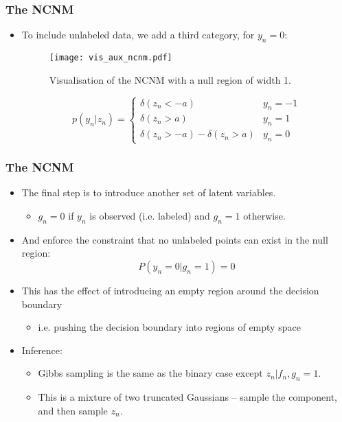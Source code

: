 \begin{frame}
	\frametitle{The \ac{NCNM}}
	\begin{itemize}
		\item To include unlabeled data, we add a third category, for $y_n=0$:
		\begin{figure}[tbh]
			\centering\texttt{[image: vis\_aux\_ncnm.pdf]}
			\centering\caption{\label{fig:vis_aux_ncnm}Visualisation of the \ac{NCNM} with a null region of width 1.}
		\end{figure}
		\[
			p(y_n|z_n) = \left\{ 
				\begin{array}{ll}
					\delta(z_n<-a) & y_n = -1\\
					\delta(z_n>a) & y_n = 1\\
					\delta(z_n>-a) - \delta(z_n>a) & y_n=0
				\end{array}
			\right.
		\]
	\end{itemize}
\end{frame}

\begin{frame}
	\frametitle{The \ac{NCNM}}
	\begin{itemize}
		\item The final step is to introduce another set of latent variables.
		\begin{itemize}
			\item $g_n=0$ if $y_n$ is observed (i.e. labeled) and $g_n=1$ otherwise.
		\end{itemize}
		\item And enforce the constraint that no unlabeled points can exist in the null region:
		\[
			P(y_n=0|g_n=1) = 0
		\]
		\item<2->This has the effect of introducing an empty region around the decision boundary
		\begin{itemize}
			\item i.e. pushing the decision boundary into regions of empty space
		\end{itemize}
		\item<3->Inference:
		\begin{itemize}
			\item Gibbs sampling is the same as the binary case except $z_n|f_n,g_n=1$.
			\item This is a mixture of two truncated Gaussians -- sample the component, and then sample $z_n$.
		\end{itemize}
	\end{itemize}
\end{frame}

